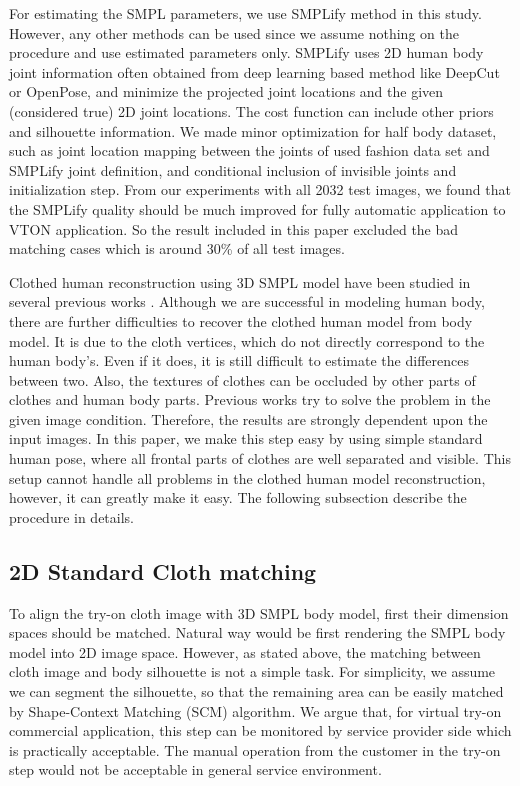 For estimating the SMPL\cite{Loper2015SMPLAS} parameters, we use SMPLify\cite{Bogo2016SMPLify} method in this study. However, any other methods can be used since we assume nothing on the procedure and use estimated parameters only. SMPLify\cite{Bogo2016SMPLify} uses 2D human body joint information often obtained from deep learning based method like DeepCut\cite{pishchulin2016deepcut} or OpenPose\cite{Cao2018OpenPoseRM}, and minimize the projected joint locations and the given (considered true) 2D joint locations. The cost function can include other priors and silhouette information. We made minor optimization for half body dataset, such as joint location mapping between the joints of used fashion data set and SMPLify joint definition, and conditional inclusion of invisible joints and initialization step.  From our experiments with all 2032 test images, we found that the SMPLify quality should be much improved for fully automatic application to VTON application. So the result included in this paper excluded the bad matching cases which is around 30\% of all test images.    
  
Clothed human reconstruction using 3D SMPL model\cite{Loper2015SMPLAS} have been studied in several previous works \cite{Weng2018PhotoW3,Zanfir2018HumanAT}. Although we are successful in modeling human body, there are further difficulties to recover the clothed human model from body model. It is due to the cloth vertices, which do not directly correspond to the human body's. Even if it does, it is still difficult to estimate the differences between two. Also, the textures of clothes can be occluded by other parts of clothes and human body parts. Previous works try to solve the problem in the given image condition. Therefore, the results are strongly dependent upon the input images. In this paper, we make this step easy by using simple standard human pose, where all frontal parts of clothes are well separated and visible. This setup cannot handle all problems in the clothed human model reconstruction, however, it can greatly make it easy. The following subsection describe the procedure in details.



\subsection{2D Standard Cloth matching}


To align the try-on cloth image with 3D SMPL\cite{Loper2015SMPLAS} body model, first their dimension spaces should be matched. Natural way would be first rendering the SMPL\cite{Loper2015SMPLAS} body model into 2D image space. However, as stated above, the matching between cloth image and body silhouette is not a simple task. For simplicity, we assume we can segment the silhouette, so that the remaining area can be easily matched by Shape-Context Matching (SCM)\cite{BelongieMP02} algorithm. We argue that, for virtual try-on commercial application, this step can be monitored by service provider side which is practically acceptable. The manual operation from the customer in the try-on step would not be acceptable in general service environment.   

